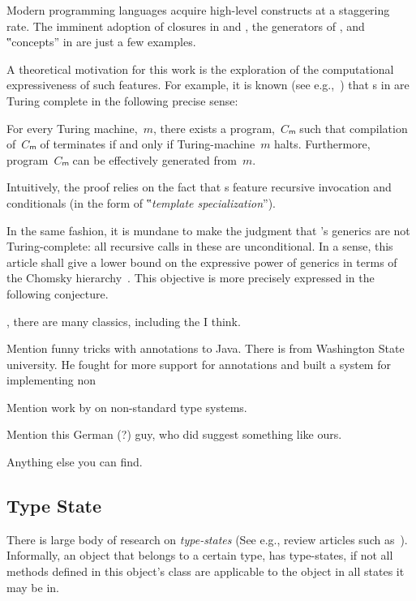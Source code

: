 Modern programming languages acquire high-level constructs
  at a staggering rate.
The imminent adoption of closures in \Java and \CC,
  the generators of \CSharp, and ‟concepts” in
  \CC are just a few examples.

A theoretical motivation for this work
  is the exploration of the computational
  expressiveness of such features.
For example, it is known (see e.g.,~\cite{Gutterman:2003}) that
  s in \CC are Turing complete in the following precise sense:

\begin{Theorem}
  \label{Theorem:Gutterman}
  For every Turing machine,~$m$, there exists a \CC program,~$Cₘ$ such that
    compilation of~$Cₘ$ of terminates if and only if
      Turing-machine~$m$ halts.
  Furthermore, program~$Cₘ$ can be effectively generated from~$m$.
\end{Theorem}

Intuitively, the proof relies on the fact that s
  feature recursive invocation and conditionals (in the form of
  ‟\emph{template specialization}”).

In the same fashion, it is mundane to make the judgment that
  \Java's generics are not Turing-complete: all recursive calls
  in these are unconditional.
In a sense, this article shall give a lower bound on the
  expressive power of \Java generics in terms of the Chomsky hierarchy~\cite{Chomsky:1963}.
This objective is more precisely expressed in the following conjecture.

\cite{Mention:all:C++:template:programming}, there are many classics, including the \cite{Abrahams:Gurtovoy:04} I think. 

Mention funny tricks with annotations to Java. There is \cite{Michael:Earnst} from 
  Washington State university. He fought for more support for annotations 
  and built a system for implementing non

Mention work by \cite{Bracha} on non-standard type systems.  

Mention this German (?) guy, who did suggest something like ours.  

Anything else you can find.

\subsection{Type State}
There is large body of research on \emph{type-states} (See e.g., review articles such
  as~\cite{Aldrich:Sunshine:2009,Bierhoff:Aldrich:2005}).
Informally, an object that belongs to a certain type, has
type-states, if not all methods defined in this object's class are applicable
to the object in all states it may be in.

